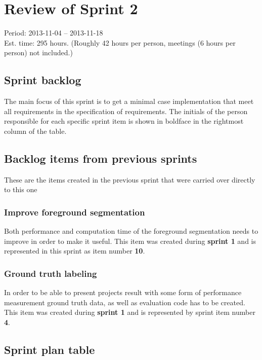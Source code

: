\section{Review of Sprint 2}
\label{sec:sprint2}
\large Period: 2013-11-04 -- 2013-11-18 \\ 
\large Est. time: 295 hours. (Roughly 42 hours per person, meetings (6 hours per person) not included.)

\subsection{Sprint backlog}
The main focus of this sprint is to get a minimal case implementation that meet all requirements in the specification of requirements. The initials of the person responsible for each specific sprint item is shown in boldface in the rightmost column of the table.

\subsection{Backlog items from previous sprints}
These are the items created in the previous sprint that were carried over directly to this one

\subsubsection{Improve foreground segmentation}
Both performance and computation time of the foreground segmentation needs to improve in order to make it useful.
This item was created during \textbf{sprint 1} and is represented in this sprint as item number \textbf{10}.

\subsubsection{Ground truth labeling}
In order to be able to present projects result with some form of performance measurement ground truth data, as well as evaluation code has to be created.
This item was created during \textbf{sprint 1} and is represented by sprint item number \textbf{4}. 

\newpage

\subsection{Sprint plan table}

